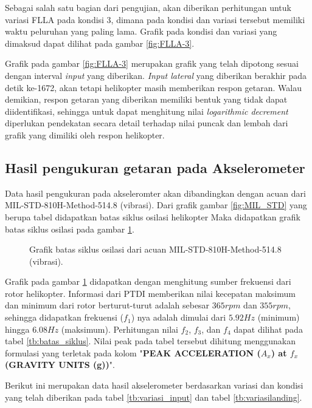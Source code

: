 Sebagai salah satu bagian dari pengujian, akan diberikan perhitungan untuk variasi FLLA pada kondisi 3, dimana pada kondisi dan variasi tersebut memiliki waktu peluruhan yang paling lama. Grafik pada kondisi dan variasi yang dimaksud dapat dilihat pada gambar \ref{fig:FLLA-3}.
 
Grafik pada gambar \ref{fig:FLLA-3} merupakan grafik yang telah dipotong sesuai dengan interval \textit{input} yang diberikan. \textit{Input lateral} yang diberikan berakhir pada detik ke-1672, akan tetapi helikopter masih memberikan respon getaran. Walau demikian, respon getaran yang diberikan memiliki bentuk yang tidak dapat diidentifikasi, sehingga untuk dapat menghitung nilai \textit{logarithmic decrement} diperlukan pendekatan secara detail terhadap nilai puncak dan lembah dari grafik yang dimiliki oleh respon helikopter.

\subsection{Hasil pengukuran getaran pada Akselerometer}

Data hasil pengukuran pada akseleromter akan dibandingkan dengan acuan dari MIL-STD-810H-Method-514.8 (vibrasi). Dari grafik gambar \ref{fig:MIL_STD} yang berupa tabel didapatkan batas siklus osilasi helikopter Maka didapatkan grafik batas siklus osilasi pada gambar \ref{fig:batas_siklus}.

\begin{figure}[H]
	\centering
	\caption{Grafik batas siklus osilasi dari acuan MIL-STD-810H-Method-514.8 (vibrasi).}
	\label{fig:batas_siklus}
\end{figure}

Grafik pada gambar \ref{fig:batas_siklus} didapatkan dengan menghitung sumber frekuensi dari rotor helikopter. Informasi dari PTDI memberikan nilai kecepatan maksimum dan minimum dari rotor berturut-turut adalah sebesar $365 rpm$ dan $355 rpm$, sehingga didapatkan frekuensi ($f_1$) nya adalah dimulai dari $5.92 Hz$ (minimum) hingga $6.08 Hz$ (maksimum). Perhitungan nilai $f_2$, $f_3$, dan $f_4$ dapat dilihat pada tabel \ref{tb:batas_siklus}. Nilai peak pada tabel tersebut dihitung menggunakan formulasi yang terletak pada kolom "\textbf{PEAK ACCELERATION ($A_x$) at $f_x$ (GRAVITY UNITS (g))}".

Berikut ini merupakan data hasil akselerometer berdasarkan variasi dan kondisi yang telah diberikan pada tabel \ref{tb:variasi_input} dan tabel \ref{tb:variasilanding}.

